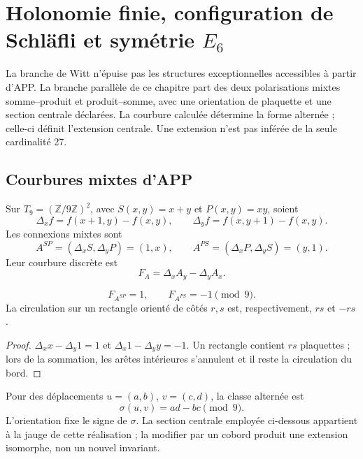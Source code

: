 \section{Holonomie finie, configuration de Schläfli et symétrie \texorpdfstring{\(E_6\)}{E6}}
\label{x_reciprocidad:p12-83-c20-s6:chap:holonomia-schlafli-e6-nuevo}

La branche de Witt n'épuise pas les structures exceptionnelles accessibles à partir d'APP. La branche parallèle de ce chapitre part des deux polarisations mixtes somme--produit et produit--somme, avec une orientation de plaquette et une section centrale déclarées. La courbure calculée détermine la forme alternée ; celle-ci définit l'extension centrale. Une extension n'est pas inférée de la seule cardinalité 27.

\subsection{Courbures mixtes d’APP}

Sur \(T_9=(\mathbb Z/9\mathbb Z)^2\), avec
\(S(x,y)=x+y\) et \(P(x,y)=xy\), soient
\[
 \Delta_xf=f(x+1,y)-f(x,y),\qquad
 \Delta_yf=f(x,y+1)-f(x,y).
\]
Les connexions mixtes sont
\[
 A^{SP}=(\Delta_xS,\Delta_yP)=(1,x),\qquad
 A^{PS}=(\Delta_xP,\Delta_yS)=(y,1).
\]
Leur courbure discrète est
\[
 F_A=\Delta_xA_y-\Delta_yA_x.
\]

\begin{proposition}
\label{x_reciprocidad:p12-83-c20-s6:prop:curvaturas-app-e6-nuevo}
\[
 F_{A^{SP}}=1,\qquad F_{A^{PS}}=-1\pmod9.
\]
La circulation sur un rectangle orienté de côtés \(r,s\) est,
respectivement, \(rs\) et \(-rs\).
\end{proposition}

\begin{proof}
\(\Delta_xx-\Delta_y1=1\) et
\(\Delta_x1-\Delta_yy=-1\). Un rectangle contient \(rs\) plaquettes ; lors de la
sommation, les arêtes intérieures s’annulent et il reste la circulation du bord.
\end{proof}

Pour des déplacements \(u=(a,b)\), \(v=(c,d)\), la classe alternée est
\begin{equation}
 \sigma(u,v)=ad-bc\pmod9.
 \label{x_reciprocidad:p12-83-c20-s6:eq:forma-alternante-e6-nueva}
\end{equation}
L’orientation fixe le signe de \(\sigma\). La section centrale employée
ci-dessous appartient à la jauge de cette réalisation ; la modifier par un cobord
produit une extension isomorphe, non un nouvel invariant.


